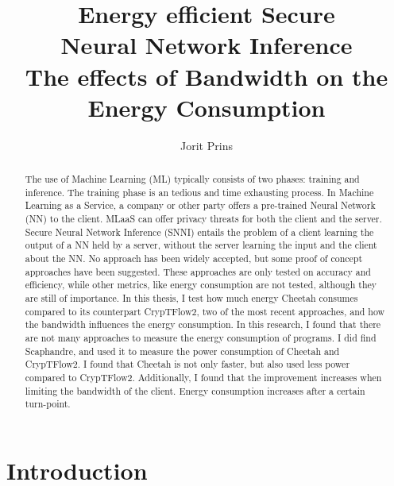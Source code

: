 \documentclass[twoside]{Style/uva-inf-bachelor-thesis}
\title{Energy efficient Secure \\Neural Network Inference
\\\large The effects of Bandwidth on the Energy Consumption}
\author{Jorit Prins}
\begin{document}
\maketitle

\begin{abstract}
The use of Machine Learning (ML) typically consists of two phases: training and inference. The training phase is an tedious and time exhausting process. In Machine Learning as a Service, a company or other party offers a pre-trained Neural Network (NN) to the client. MLaaS can offer privacy threats for both the client and the server. Secure Neural Network Inference (SNNI) entails the problem of a client learning the output of a NN held by a server, without the server learning the input and the client about the NN. No approach has been widely accepted, but some proof of concept approaches have been suggested. These approaches are only tested on accuracy and efficiency, while other metrics, like energy consumption are not tested, although they are still of importance. In this thesis, I test how much energy Cheetah consumes compared to its counterpart CrypTFlow2, two of the most recent approaches, and how the bandwidth influences the energy consumption. In this research, I found that there are not many approaches to measure the energy consumption of programs. I did find Scaphandre, and used it to measure the power consumption of Cheetah and CrypTFlow2. I found that Cheetah is not only faster, but also used less power compared to CrypTFlow2. Additionally, I found that the improvement increases when limiting the bandwidth of the client. Energy consumption increases after a certain turn-point.

\end{abstract}

\tableofcontents

\chapter{Introduction}\label{chap:introduction}

\end{document}
